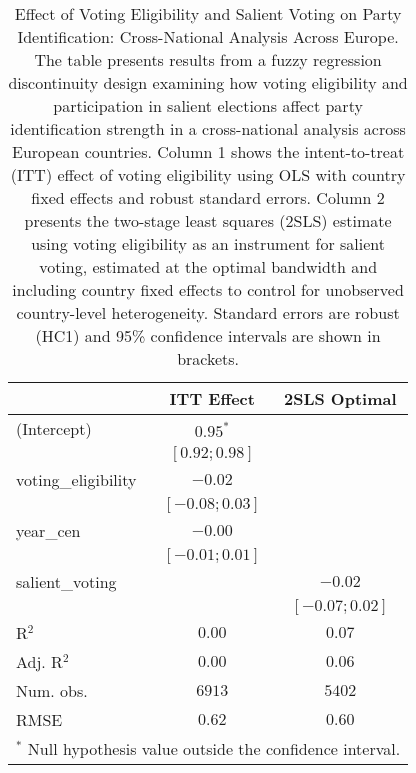 
\begin{table}
\begin{center}
\begin{tabular}{l c c}
\hline
 & ITT Effect & 2SLS Optimal \\
\hline
(Intercept)         & $0.95^{*}$       &                  \\
                    & $ [ 0.92; 0.98]$ &                  \\
voting\_eligibility & $-0.02$          &                  \\
                    & $ [-0.08; 0.03]$ &                  \\
year\_cen           & $-0.00$          &                  \\
                    & $ [-0.01; 0.01]$ &                  \\
salient\_voting     &                  & $-0.02$          \\
                    &                  & $ [-0.07; 0.02]$ \\
\hline
R$^2$               & $0.00$           & $0.07$           \\
Adj. R$^2$          & $0.00$           & $0.06$           \\
Num. obs.           & $6913$           & $5402$           \\
RMSE                & $0.62$           & $0.60$           \\
\hline
\multicolumn{3}{l}{\scriptsize{$^*$ Null hypothesis value outside the confidence interval.}}
\end{tabular}
\caption{Effect of Voting Eligibility and Salient Voting on Party Identification: Cross-National Analysis Across Europe. The table presents results from a fuzzy regression discontinuity design examining how voting eligibility and participation in salient elections affect party identification strength in a cross-national analysis across European countries. Column 1 shows the intent-to-treat (ITT) effect of voting eligibility using OLS with country fixed effects and robust standard errors. Column 2 presents the two-stage least squares (2SLS) estimate using voting eligibility as an instrument for salient voting, estimated at the optimal bandwidth and including country fixed effects to control for unobserved country-level heterogeneity. Standard errors are robust (HC1) and 95\% confidence intervals are shown in brackets.}
\label{table:main_results_pid}
\end{center}
\end{table}
